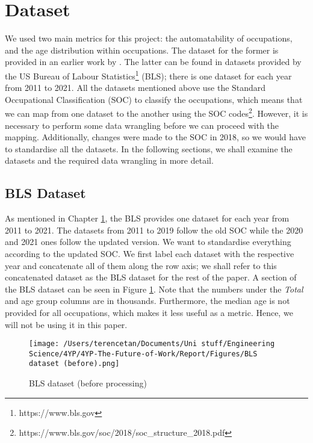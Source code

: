 \documentclass[11pt]{article}
\begin{document}
\section{Dataset}
\label{sec:Dataset}
We used two main metrics for this project: the automatability of occupations, and the age distribution within occupations. The dataset for the former is provided in an earlier work by \cite{futureofemployment}. The latter can be found in datasets provided by the US Bureau of Labour Statistics\footnote{https://www.bls.gov} (BLS); there is one dataset for each year from 2011 to 2021. All the datasets mentioned above use the Standard Occupational Classification (SOC) to classify the occupations, which means that we can map from one dataset to the another using the SOC codes\footnote{https://www.bls.gov/soc/2018/soc\_structure\_2018.pdf}. However, it is necessary to perform some data wrangling before we can proceed with the mapping. Additionally, changes were made to the SOC in 2018, so we would have to standardise all the datasets. In the following sections, we shall examine the datasets and the required data wrangling in more detail.

\subsection{BLS Dataset}
\label{subsec: BLS}
As mentioned in Chapter \ref{sec:Dataset}, the BLS provides one dataset for each year from 2011 to 2021. The datasets from 2011 to 2019 follow the old SOC while the 2020 and 2021 ones follow the updated version. We want to standardise everything according to the updated SOC. We first label each dataset with the respective year and concatenate  all of them along the row axis; we shall refer to this concatenated dataset as the BLS dataset for the rest of the paper. A section of the BLS dataset can be seen in Figure \ref{fig:df}. Note that the numbers under the \emph{Total} and age group columns are in thousands. Furthermore, the median age is not provided for all occupations, which makes it less useful as a metric. Hence, we will not be using it in this paper.

\begin{figure}[!htb]
    \centering
    \texttt{[image: /Users/terencetan/Documents/Uni stuff/Engineering Science/4YP/4YP-The-Future-of-Work/Report/Figures/BLS dataset (before).png]}
    \caption{BLS dataset (before processing)}
	\label{fig:df}
\end{figure}
\end{document}

